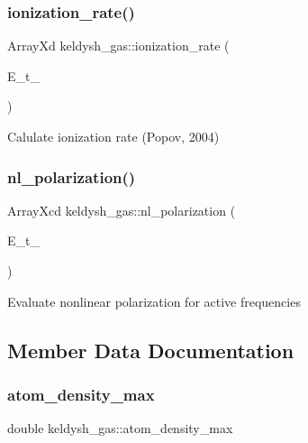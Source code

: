 \subsubsection{\texorpdfstring{ionization\+\_\+rate()}{ionization\_rate()}}
{\footnotesize\ttfamily Array\+Xd keldysh\+\_\+gas\+::ionization\+\_\+rate (\begin{DoxyParamCaption}\item[{Array\+Xd}]{E\+\_\+t\+\_\+ }\end{DoxyParamCaption})}

Calulate ionization rate (Popov, 2004) \mbox{\label{classkeldysh__gas_a1cd65d1983cb6c5ff9d04eeb29e94dd5}} 
\subsubsection{\texorpdfstring{nl\+\_\+polarization()}{nl\_polarization()}}
{\footnotesize\ttfamily Array\+Xcd keldysh\+\_\+gas\+::nl\+\_\+polarization (\begin{DoxyParamCaption}\item[{Array\+Xd}]{E\+\_\+t\+\_\+ }\end{DoxyParamCaption})}

Evaluate nonlinear polarization for active frequencies 

\subsection{Member Data Documentation}
\mbox{\label{classkeldysh__gas_a287e2c7a3081d8b65ba126288a3174bd}} 
\subsubsection{\texorpdfstring{atom\+\_\+density\+\_\+max}{atom\_density\_max}}
{\footnotesize\ttfamily double keldysh\+\_\+gas\+::atom\+\_\+density\+\_\+max}

\mbox{\label{classkeldysh__gas_a7a66e438ff78b240fe419c0a426b1648}} 
